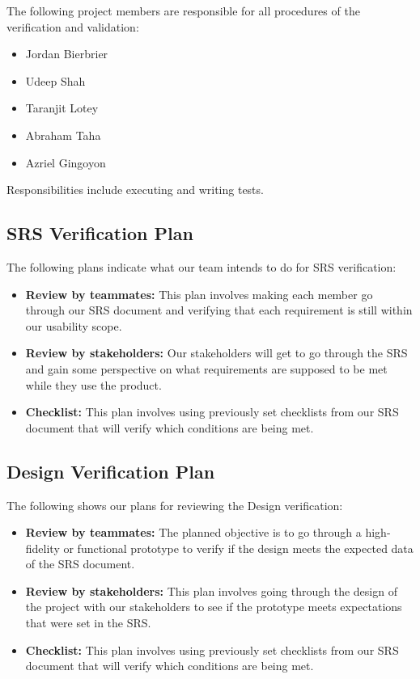 \documentclass[12pt, titlepage]{article}
\begin{document}
The following project members are responsible for all procedures of the verification and validation:
\begin{itemize}
    \item Jordan Bierbrier 
    \item Udeep Shah
    \item Taranjit Lotey
    \item Abraham Taha
    \item Azriel Gingoyon
\end{itemize}

\noindent Responsibilities include executing and writing tests.

\subsection{SRS Verification Plan}

The following plans indicate what our team intends to do for SRS verification:
\begin{itemize}
    \item \textbf{Review by teammates:} This plan involves making each member go through our SRS document and verifying that each requirement is still within our usability scope.
    \item \textbf{Review by stakeholders:} Our stakeholders will get to go through the SRS and gain some perspective on what requirements are supposed to be met while they use the product.
    \item \textbf{Checklist:} This plan involves using previously set checklists from our SRS document that will verify which conditions are being met.
\end{itemize}

\subsection{Design Verification Plan}

The following shows our plans for reviewing the Design verification:
\begin{itemize}
    \item \textbf{Review by teammates:} The planned objective is to go through a high-fidelity or functional prototype to verify if the design meets the expected data of the SRS document.
    \item \textbf{Review by stakeholders:} This plan involves going through the design of the project with our stakeholders to see if the prototype meets expectations that were set in the SRS.
    \item \textbf{Checklist:} This plan involves using previously set checklists from our SRS document that will verify which conditions are being met.
\end{itemize}
\end{document}
